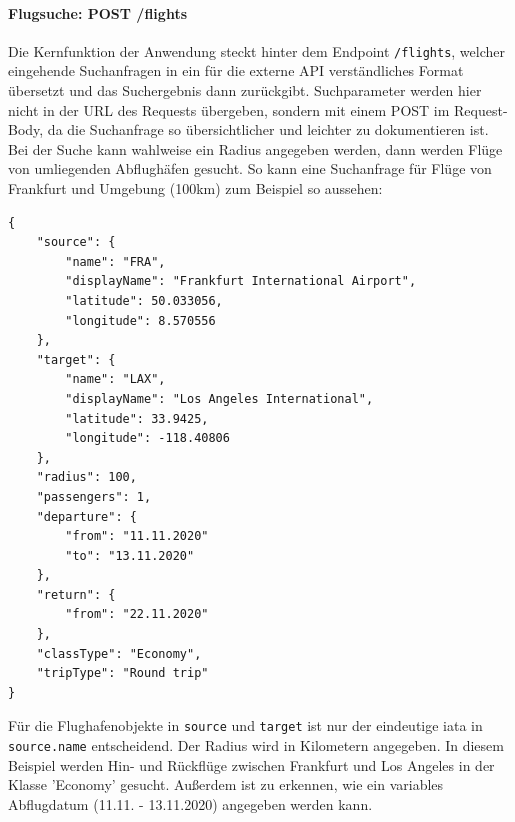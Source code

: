 \documentclass[12pt,twoside,a4paper]{article}
\begin{document}
\paragraph[Flugsuche]{Flugsuche: POST /flights}
Die Kernfunktion der Anwendung steckt hinter dem Endpoint \texttt{/flights}, welcher eingehende Suchanfragen in ein für die externe API verständliches Format übersetzt und das Suchergebnis dann zurückgibt. Suchparameter werden hier nicht in der URL des Requests übergeben, sondern mit einem POST im Request-Body, da die Suchanfrage so übersichtlicher und leichter zu dokumentieren ist. Bei der Suche kann wahlweise ein Radius angegeben werden, dann werden Flüge von umliegenden Abflughäfen gesucht. So kann eine Suchanfrage für Flüge von Frankfurt und Umgebung (100km) zum Beispiel so aussehen:\\
\begin{Verbatim}
{
	"source": {
		"name": "FRA",
		"displayName": "Frankfurt International Airport",
		"latitude": 50.033056,
		"longitude": 8.570556
	},
	"target": {
		"name": "LAX",
		"displayName": "Los Angeles International",
		"latitude": 33.9425,
		"longitude": -118.40806
	},
	"radius": 100,
	"passengers": 1,
	"departure": {
		"from": "11.11.2020"
		"to": "13.11.2020"
	},
	"return": {
		"from": "22.11.2020"
	},
	"classType": "Economy",
	"tripType": "Round trip"
}
\end{Verbatim}
Für die Flughafenobjekte in \texttt{source} und \texttt{target} ist nur der eindeutige \acrlong{iata} in \texttt{source.name} entscheidend. Der Radius wird in Kilometern angegeben. In diesem Beispiel werden Hin- und Rückflüge zwischen Frankfurt und Los Angeles in der Klasse 'Economy' gesucht. Außerdem ist zu erkennen, wie ein variables Abflugdatum (11.11. - 13.11.2020) angegeben werden kann.
\end{document}
